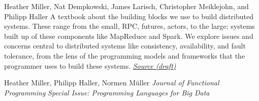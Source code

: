 \documentclass[9pt]{article}
\begin{document}



\medskip
{}

\newline\noindent Heather Miller, Nat Dempkowski, James Larisch, 
\newline\noindent Christopher Meiklejohn, and Philipp Haller
\smallskip
\newline\noindent A textbook about the building blocks we use to build distributed systems. These range from the small, RPC, futures, actors, to the large; systems built up of these components like MapReduce and Spark. We explore issues and concerns central to distributed systems like consistency, availability, and fault tolerance, from the lens of the programming models and frameworks that the programmer uses to build these systems.
\newline\noindent\href{https://github.com/heathermiller/dist-prog-book}{\em Source (draft)}
\bigskip

\medskip


\newline\noindent Heather Miller, Philipp Haller, Normen M\"{u}ller
\newline\noindent\emph{Journal of Functional Programming}
\newline\noindent\emph{Special Issue: Programming Languages for Big Data}
\bigskip
\end{document}
